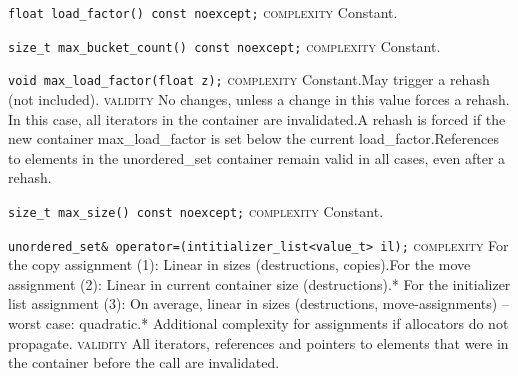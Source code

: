 \noindent{}\hspace*{0.25em}\lstinline[basicstyle=\ttfamily\color{cgreen}]{float load_factor() const noexcept;} \textsc{complexity} Constant.\\\vspace{-0.6em}

\noindent{}\hspace*{0.25em}\lstinline[basicstyle=\ttfamily\color{cgreen}]{size_t max_bucket_count() const noexcept;} \textsc{complexity} Constant.\\\vspace{-0.6em}

\noindent{}\hspace*{0.25em}\lstinline[basicstyle=\ttfamily\color{cgreen}]{void max_load_factor(float z);} \textsc{complexity} Constant.May trigger a rehash (not included). \textsc{validity} No changes, unless a change in this value forces a rehash. In this case, all iterators in the container are invalidated.A rehash is forced if the new container max\_load\_factor is set below the current load\_factor.References to elements in the unordered\_set container remain valid in all cases, even after a rehash.\\\vspace{-0.6em}

\noindent{}\hspace*{0.25em}\lstinline[basicstyle=\ttfamily\color{cgreen}]{size_t max_size() const noexcept;} \textsc{complexity} Constant.\\\vspace{-0.6em}

\noindent{}\hspace*{0.25em}\lstinline[basicstyle=\ttfamily\color{corange}]{unordered_set& operator=(intitializer_list<value_t> il);} \textsc{complexity} For the copy assignment (1): Linear in sizes (destructions, copies).For the move assignment (2): Linear in current container size (destructions).* For the initializer list assignment (3): On average, linear in sizes (destructions, move-assignments) -- worst case: quadratic.* Additional complexity for assignments if allocators do not propagate. \textsc{validity} All iterators, references and pointers to elements that were in the container before the call are invalidated.\\\vspace{-0.6em}

